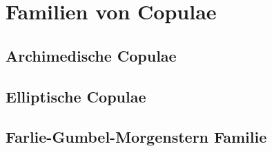 
\section{Familien von Copulae}
\label{sec:familien}

\subsection{Archimedische Copulae}
\label{sec:archimedische}

\subsection{Elliptische Copulae}
\label{sec:elliptische}

\subsection{Farlie-Gumbel-Morgenstern Familie}
\label{sec:fgm}

